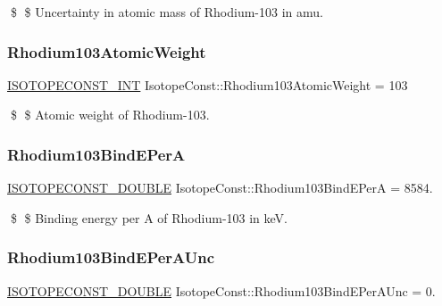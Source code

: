 \$ \$ Uncertainty in atomic mass of Rhodium-\/103 in amu. \mbox{\label{group___isotope_const-_rhodium-_rh103_ga8cf706e87365b521a788bdc726198f15}} 
\subsubsection{\texorpdfstring{Rhodium103\+Atomic\+Weight}{Rhodium103AtomicWeight}}
{\footnotesize\ttfamily \mbox{\hyperlink{group___isotope_const-_macros_ga5f18360b3e99483a35c32d789e62621c}{I\+S\+O\+T\+O\+P\+E\+C\+O\+N\+S\+T\+\_\+\+I\+NT}} Isotope\+Const\+::\+Rhodium103\+Atomic\+Weight = 103}

\$ \$ Atomic weight of Rhodium-\/103. \mbox{\label{group___isotope_const-_rhodium-_rh103_ga1570417b63db2740c75515af60849626}} 
\subsubsection{\texorpdfstring{Rhodium103\+Bind\+E\+PerA}{Rhodium103BindEPerA}}
{\footnotesize\ttfamily \mbox{\hyperlink{group___isotope_const-_macros_ga8f45a7272ce02c0b4c65c44636ed719a}{I\+S\+O\+T\+O\+P\+E\+C\+O\+N\+S\+T\+\_\+\+D\+O\+U\+B\+LE}} Isotope\+Const\+::\+Rhodium103\+Bind\+E\+PerA = 8584.}

\$ \$ Binding energy per A of Rhodium-\/103 in keV. \mbox{\label{group___isotope_const-_rhodium-_rh103_ga736c174d6146e1a635d166043b645d41}} 
\subsubsection{\texorpdfstring{Rhodium103\+Bind\+E\+Per\+A\+Unc}{Rhodium103BindEPerAUnc}}
{\footnotesize\ttfamily \mbox{\hyperlink{group___isotope_const-_macros_ga8f45a7272ce02c0b4c65c44636ed719a}{I\+S\+O\+T\+O\+P\+E\+C\+O\+N\+S\+T\+\_\+\+D\+O\+U\+B\+LE}} Isotope\+Const\+::\+Rhodium103\+Bind\+E\+Per\+A\+Unc = 0.}

